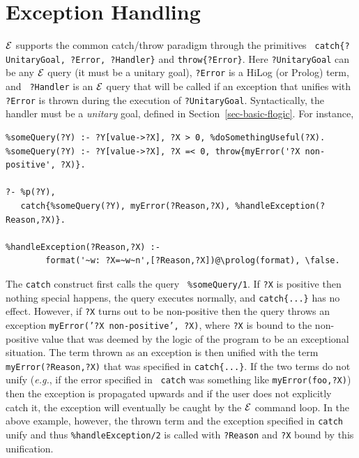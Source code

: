 \documentclass[11pt]{article}
\newcommand{\ERGO}{\mbox{\ensuremath{\cal{E}}\smaller{{\sc{RGO}}}}\xspace}
\newcommand{\FLSYSTEM}{\ERGO}
\begin{document}
\section{Exception Handling}\label{sec-errors}

\FLSYSTEM supports the common catch/throw paradigm through the primitives {\tt
  catch\{?UnitaryGoal, ?Error, ?Handler\}} and {\tt throw\{?Error\}}.  Here
{\tt ?UnitaryGoal}
can be any \FLSYSTEM query (it must be a unitary goal), {\tt ?Error} is a HiLog (or Prolog) term, and {\tt
  ?Handler} is an \FLSYSTEM query that will be called if an exception that
unifies with {\tt ?Error} is thrown during the execution of {\tt ?UnitaryGoal}. 
Syntactically, the handler must be a \emph{unitary} goal, defined in
Section~\ref{sec-basic-flogic}.
For instance,

\begin{verbatim}
%someQuery(?Y) :- ?Y[value->?X], ?X > 0, %doSomethingUseful(?X).  
%someQuery(?Y) :- ?Y[value->?X], ?X =< 0, throw{myError('?X non-positive', ?X)}.

?- %p(?Y),
   catch{%someQuery(?Y), myError(?Reason,?X), %handleException(?Reason,?X)}.

%handleException(?Reason,?X) :-
        format('~w: ?X=~w~n',[?Reason,?X])@\prolog(format), \false.
\end{verbatim}
The {\tt catch} construct first calls the query {\tt
  \verb|%|someQuery/1}. If {\tt ?X} is positive then nothing special
  happens, the query executes normally, and {\tt catch\{...\}} has no
  effect.  However, if {\tt ?X} turns out to be non-positive then the
  query throws an exception {\tt myError('?X {\tt non-positive', ?X)}},
  where {\tt ?X} is bound to the non-positive value that was deemed by
  the logic of the program to be an exceptional situation.  The term
  thrown as an exception is then unified with the term {\tt
  myError(?Reason,?X)} that was specified in {\tt catch\{...\}}. If the
  two terms do not unify ({\it e.g.}, if the error specified in {\tt
  catch} was something like {\tt myError(foo,?X)}) then the exception is
  propagated upwards and if the user does not explicitly catch it, the
  exception will eventually be caught by the \FLSYSTEM command loop. In the
  above example,
  however, the thrown term and the exception specified in
  {\tt catch} unify and thus {\tt \verb|%|handleException/2} is called
  with {\tt ?Reason} and {\tt ?X} bound by this unification.
\end{document}
